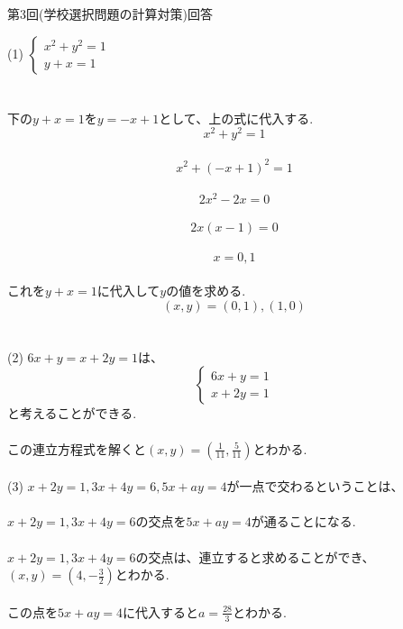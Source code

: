 \documentclass{jarticle}
\begin{document}
\begin{center}
第3回(学校選択問題の計算対策)回答
\end{center}
(1)
$
\begin{cases}
x^{2}+y^{2}=1\\
y+x=1
\end{cases}
$
\\
\\
\\
下の$y+x=1$を$y=-x+1$として、上の式に代入する.\\
\[x^{2}+y^{2}=1\]
\\
\[x^{2}+(-x+1)^{2}=1\]
\\
\[2x^{2}-2x=0\]
\\
\[2x(x-1)=0\]
\\
\[x=0,1\]
\\
これを$y+x=1$に代入して$y$の値を求める.
\\
\[(x,y)=(0,1),(1,0)\]
\\
\\
(2)
$6x+y=x+2y=1$は、
\[
\begin{cases}
6x+y=1\\
x+2y=1
\end{cases}
\]
と考えることができる.
\\
\\
この連立方程式を解くと$(x,y)=(\frac{1}{11},\frac{5}{11})$とわかる.
\\
\\
(3)
$x+2y=1,3x+4y=6,5x+ay=4$が一点で交わるということは、
\\
\\
$x+2y=1,3x+4y=6$の交点を$5x+ay=4$が通ることになる.
\\
\\
$x+2y=1,3x+4y=6$の交点は、連立すると求めることができ、$(x,y)=(4,-\frac{3}{2})$とわかる.
\\
\\
この点を$5x+ay=4$に代入すると$a=\frac{28}{3}$とわかる.
\end{document}
